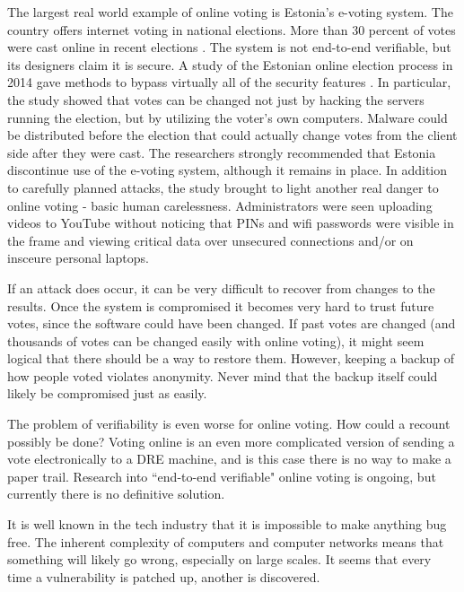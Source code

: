 \documentclass[12pt, titlepage]{article}
\begin{document}
The largest real world example of online voting is Estonia's e-voting system. The country offers internet voting in national elections. More than 30 percent of votes were cast online in recent elections \cite{hao2016real}. The system is not end-to-end verifiable, but its designers claim it is secure. A study of the Estonian online election process in 2014 gave methods to bypass virtually all of the security features \cite{springall2014security}. In particular, the study showed that votes can be changed not just by hacking the servers running the election, but by utilizing the voter's own computers. Malware could be distributed before the election that could actually change votes from the client side after they were cast. The researchers strongly recommended that Estonia discontinue use of the e-voting system, although it remains in place. In addition to carefully planned attacks, the study brought to light another real danger to online voting - basic human carelessness. Administrators were seen uploading videos to YouTube without noticing that PINs and wifi passwords were visible in the frame and viewing critical data over unsecured connections and/or on insceure personal laptops.

If an attack does occur, it can be very difficult to recover from changes to the results. Once the system is compromised it becomes very hard to trust future votes, since the software could have been changed. If past votes are changed (and thousands of votes can be changed easily with online voting), it might seem logical that there should be a way to restore them. However, keeping a backup of how people voted violates anonymity. Never mind that the backup itself could likely be compromised just as easily.

The problem of verifiability is even worse for online voting. How could a recount possibly be done? Voting online is an even more complicated version of sending a vote electronically to a DRE machine, and is this case there is no way to make a paper trail. Research into ``end-to-end verifiable" online voting is ongoing, but currently there is no definitive solution.

It is well known in the tech industry that it is impossible to make anything bug free. The inherent complexity of computers and computer networks means that something will likely go wrong, especially on large scales. It seems that every time a vulnerability is patched up, another is discovered.

\newpage
\printbibliography
\end{document}

